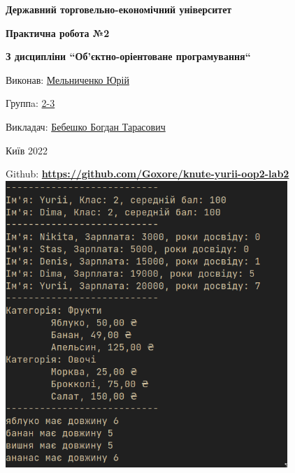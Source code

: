 \documentclass{article}
\begin{document}
\begin{titlepage}
    \begin{center}
        \Large\textbf{Державний торговельно-економічний університет}\\
        \vspace{2.5 em}

        \large\textbf{Практична робота №2}\\
        \vspace{1 em}

        \large\textbf{З дисципліни ``Об'єктно-оріентоване програмування``}\\
        \vspace{1 em}

    \end{center}
    \vspace{3.5 em}

    Виконав: \underline{Мельниченко Юрій}\\
    \vspace{-0.3 em}

    Группa: \underline{2-3}\\
    \vspace{-0.3 em}

    Викладач: \underline{Бебешко Богдан Тарасович}\\

    \vfill

    \begin{center}
        Київ 2022
    \end{center}
\end{titlepage}

\noindent
Github: \textbf{\href{https://github.com/Goxore/knute-yurii-oop2-lab2}{https://github.com/Goxore/knute-yurii-oop2-lab2}} \\

\includegraphics[width=0.8\textwidth]{img/2023-02-26-18-09-02.png}
\end{document}
